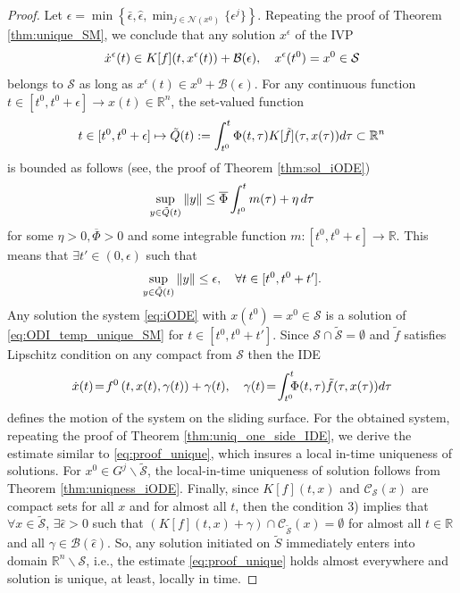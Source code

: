 \documentclass[10pt,a4paper]{amsart}
\newcommand{\R}{\mathbb{R}}
\begin{document}
\begin{proof}
	Let $\epsilon =\min\left\{\bar \epsilon,\hat \epsilon, \min_{j\in \mathcal{N}(x^0)}\{\epsilon^j\}\right\}$.
	Repeating the proof of Theorem \ref{thm:unique_SM},  we conclude  that any solution 
	$x^{\epsilon}$
	of the IVP\vspace{-1mm}
	\begin{equation}\label{eq:ODI_temp_unique_SM}
		\dot x^{\epsilon}(t)\in K[f](t,x^{\epsilon}(t))+\mathcal{B}(\epsilon), \quad x^{\epsilon}(t^0)=x^0\in \mathcal{S}\vspace{-1mm}
	\end{equation}
	belongs to $\mathcal{S}$	as long as $x^{\epsilon}(t)\in x^0+\mathcal{B}(\epsilon)$. 
	For any continuous function $t\in [t^0,t^0+\epsilon]\to x(t)\in \R^n$, the set-valued function \vspace{-1mm}
	$$
	t\in [t^0,t^0+\epsilon]\mapsto \tilde Q(t):=\int^t_{t^0} \Phi(t,\tau) K[\tilde f](\tau,x(\tau)) d\tau\subset \R^n\vspace{-1mm}
	$$ is bounded as follows (see, the proof of Theorem \ref{thm:sol_iODE})\vspace{-1mm}
	\[
	\sup_{y\in \tilde Q(t)} \|y\|\leq \overline{\Phi}\int^t_{t^0}m(\tau) +\eta\, d\tau\vspace{-1mm}
	\]
	for some $\eta>0, \overline{\Phi}>0$ and some integrable function $m:[t^0,t^0+\epsilon]\to \R$. This means that $\exists t'\in (0,\epsilon)$ such that \vspace{-1mm}
	\[
	\sup_{y\in \tilde Q(t)} \|y\|\leq\epsilon, \quad \forall t\in [t^0,t^0+t'].\vspace{-1mm}
	\]
	Any solution the system \eqref{eq:iODE} with $x(t^0)=x^0\in \mathcal{S}$ is a solution of \eqref{eq:ODI_temp_unique_SM} for  $t\in[t^0,t^0+t']$. Since $\mathcal{S}\cap \tilde {\mathcal{S}}=\emptyset$  and  $\tilde f$ satisfies Lipschitz condition on any compact from $\mathcal{S}$  then  the IDE\vspace{-1mm}
	\begin{equation*}
\dot x(t)\!=\!f^0\left(t,x(t),\gamma(t)\right)+\gamma(t), \quad \gamma(t)\!=\!\int^t_{t^0}\!\!\!\Phi(t,\tau) \tilde f(\tau,x(\tau)) d\tau\vspace{-1mm}
	\end{equation*}
   defines the motion of the system on the sliding surface. 
  {For the obtained system, repeating the proof of Theorem  \ref{thm:uniq_one_side_IDE}, we derive the estimate similar to \eqref{eq:proof_unique}, which insures a local in-time uniqueness of solutions.  	For $x^0\in  G^j\backslash \tilde{\mathcal{S}}$, the local-in-time  uniqueness of solution  follows from  Theorem \ref{thm:uniqness_iODE}.  Finally, since $K[f](t,x)$ and $\mathcal{C}_{\mathcal{S}}(x)$ are compact sets  for all $x$ and for almost all $t$, then the condition 3) implies that 
  	$\forall x\in \tilde {\mathcal{S}}$, $\exists \hat \epsilon\!>\!0$ such that  $\left(K[f](t,x)+\gamma \right)\cap \mathcal{C}_{\tilde{\mathcal{S}}}(x)=\emptyset$  for almost all $t\in \R$ and 
  	all $\gamma\in \mathcal{B}(\hat \epsilon)$.
  	So, any solution  initiated on $\tilde S$ immediately enters into  domain $\R^n\backslash\mathcal{S}$, i.e., the estimate \eqref{eq:proof_unique} holds almost everywhere and solution is unique, at least, locally in time.}
\end{proof}
\end{document}
